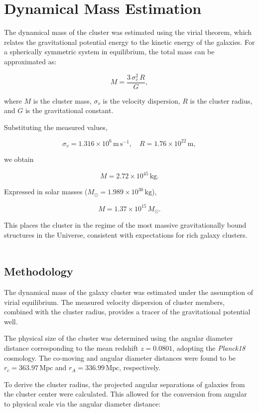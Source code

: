 \documentclass[12pt]{article}
\begin{document}
\section{Dynamical Mass Estimation}

The dynamical mass of the cluster was estimated using the virial theorem, which relates the gravitational potential energy to the 
kinetic energy of the galaxies. For a spherically symmetric system in equilibrium, the total mass can be approximated as:

\[
M = \frac{3 \, \sigma_v^2 \, R}{G},
\]

where \(M\) is the cluster mass, \(\sigma_v\) is the velocity dispersion, \(R\) is the cluster radius, and \(G\) is the gravitational constant.

Substituting the measured values,

\[
\sigma_v = 1.316 \times 10^6 \, \mathrm{m \, s^{-1}}, \quad
R = 1.76 \times 10^{22} \, \mathrm{m},
\]

we obtain

\[
M = 2.72 \times 10^{45} \, \mathrm{kg}.
\]

Expressed in solar masses (\(M_\odot = 1.989 \times 10^{30} \, \mathrm{kg}\)),

\[
M = 1.37 \times 10^{15} \, M_\odot.
\]

This places the cluster in the regime of the most massive gravitationally bound structures in the Universe, consistent with 
expectations for rich galaxy clusters.
\\\\
\subsection{Methodology}
The dynamical mass of the galaxy cluster was estimated under the assumption of 
virial equilibrium. The measured velocity dispersion of cluster members, combined 
with the cluster radius, provides a tracer of the gravitational potential well. 

The physical size of the cluster was determined using the angular diameter distance 
corresponding to the mean redshift $z = 0.0801$, adopting the \textit{Planck18} 
cosmology. The co-moving and angular diameter distances were found to be 
$r_c = 363.97 \,\mathrm{Mpc}$ and $r_A = 336.99 \,\mathrm{Mpc}$, respectively. 

To derive the cluster radius, the projected angular separations of galaxies from the 
cluster center were calculated. This allowed for the conversion from angular to physical 
scale via the angular diameter distance:
\end{document}
